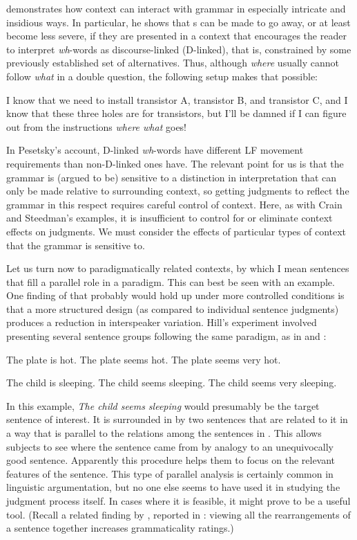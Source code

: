 \citet{Pesetsky1987} demonstrates how context can interact with grammar in especially intricate and insidious ways. In particular, he shows that s can be made to go away, or at least become less severe, if they are presented in a context that encourages the reader to interpret \textit{wh}-words as discourse-linked (D-linked), that is, constrained by some previously established set of alternatives. Thus, although \textit{where} usually cannot follow \textit{what} in a double question, the following setup makes that possible:

\ea%
    \label{ex:5:9}  
I know that we need to install transistor A, transistor B, and transistor C, and I know that these three holes are for transistors, but I'll be damned if I can figure out from the instructions \textit{where what} goes!
	 
\z

\noindent
In Pesetsky's account, D-linked \textit{wh}-words have different LF movement requirements than non-D-linked ones have. The relevant point for us is that the grammar is (argued to be) sensitive to a distinction in interpretation that can only be made relative to surrounding  context, so getting judgments to reflect the grammar in this respect requires careful control of context. Here, as with Crain and Steedman's examples, it is insufficient to control for or eliminate context effects on judgments.
We must consider the effects of particular types of context that the grammar is sensitive to. 


Let us turn now to paradigmatically  related contexts, by which I mean sentences that fill a parallel role in a paradigm. This can best be seen with an example. One finding of \citet{Hill1961} that probably would hold up under more controlled conditions is that a more structured design (as compared to individual sentence judgments) produces a reduction in interspeaker variation. Hill's experiment involved presenting several sentence groups following the same paradigm, as in  and :

\ea\label{ex:5:10}
The plate is hot. The plate seems hot. The plate seems very hot.
\z

\ea\label{ex:5:11}
The child is sleeping. The child seems sleeping. The child seems very sleeping.
\z

\noindent
In this example, \textit{The child seems sleeping} would presumably be the target sentence of interest. It is surrounded in  by two sentences that are related to it in a way that is parallel to the relations among the sentences in . This allows subjects  to see where the sentence came from by analogy to an unequivocally  good sentence. Apparently  this procedure helps them to focus on the relevant features of the sentence. This type of parallel analysis is certainly common in linguistic argumentation,  but  no one else seems to  have  used  it in studying the judgment process itself. In cases where it is feasible, it might prove to be a useful tool. (Recall a related finding by \citet{ScottEtAl1973}, reported in : viewing all the rearrangements  of a sentence together  increases grammaticality  ratings.)

